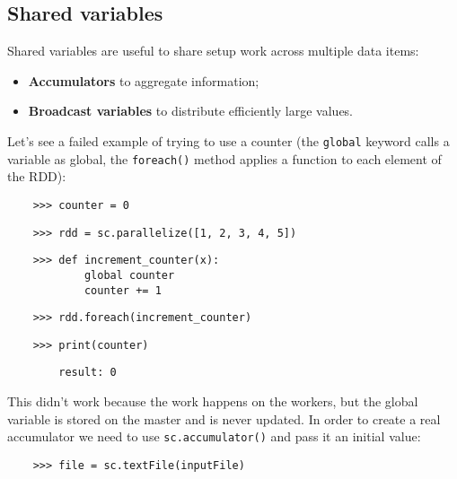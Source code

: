 \subsection{Shared variables}


Shared variables are useful to share setup work across multiple data items:

\begin{itemize}

    \item \textbf{Accumulators} to aggregate information;

    \item \textbf{Broadcast variables} to distribute efficiently large values.

\end{itemize}


Let's see a failed example of trying to use a counter (the \texttt{global} keyword calls a variable as global, the \texttt{foreach()} method applies a function to each element of the RDD):

\begin{lstlisting}
    >>> counter = 0
\end{lstlisting}

\begin{lstlisting}
    >>> rdd = sc.parallelize([1, 2, 3, 4, 5])
\end{lstlisting}

\begin{lstlisting}
    >>> def increment_counter(x):
            global counter
            counter += 1
\end{lstlisting}

\begin{lstlisting}
    >>> rdd.foreach(increment_counter)
\end{lstlisting}

\begin{lstlisting}
    >>> print(counter)
\end{lstlisting}

\begin{lstlisting}
        result: 0
\end{lstlisting}

This didn't work because the work happens on the workers, but the global variable is stored on the master and is never updated.
In order to create a real accumulator we need to use \texttt{sc.accumulator()} and pass it an initial value:

\begin{lstlisting}
    >>> file = sc.textFile(inputFile)
\end{lstlisting}

